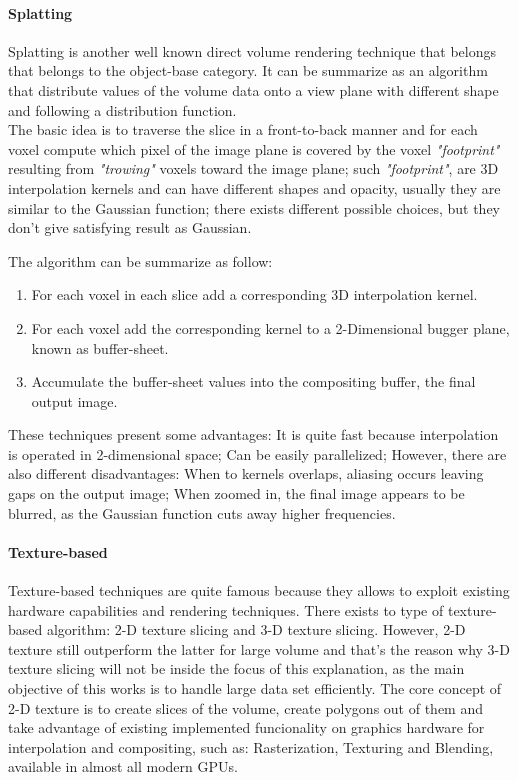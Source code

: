 \documentclass[10pt,a4paper]{article}
\begin{document}
\paragraph{Splatting} Splatting is another well known direct volume rendering technique that belongs that belongs to the object-base category. It can be summarize as an algorithm that distribute values of the volume data onto a view plane with different shape and following a distribution function.\\ The basic idea is to traverse the slice in a front-to-back manner and for each voxel compute which pixel of the image plane is covered by the voxel \textit{"footprint"} resulting from \textit{"trowing"} voxels toward the image plane; such \textit{"footprint"}, are 3D interpolation kernels %
and can have different shapes and opacity, usually they are similar to the Gaussian function; there exists different possible choices, but they don't give satisfying result as Gaussian.

The algorithm can be summarize as follow:
\begin{enumerate}
\item For each voxel in each slice add a corresponding 3D interpolation kernel.
\item For each voxel add the corresponding kernel to a 2-Dimensional bugger plane, known as buffer-sheet.
\item Accumulate the buffer-sheet values into the compositing buffer, the final output image. 
\end{enumerate}

These techniques present some advantages: It is quite fast because interpolation is operated in 2-dimensional space; Can be easily parallelized;
However, there are also different disadvantages: When to kernels overlaps, aliasing occurs leaving gaps on the output image; When zoomed in, the final image appears to be blurred, as the Gaussian function cuts away higher frequencies.

\paragraph{Texture-based} Texture-based techniques are quite famous because they allows to exploit existing hardware capabilities and rendering techniques. There exists to type of texture-based algorithm: 2-D texture slicing and 3-D texture slicing. However, 2-D texture still outperform the latter for large volume and that's the reason why 3-D texture slicing will not be inside the focus of this explanation, as the main objective of this works is to handle large data set efficiently.
The core concept of 2-D texture is to create slices of the volume, create polygons out of them and take advantage of existing implemented funcionality on graphics hardware for interpolation and compositing, such as: Rasterization, Texturing and Blending, available in almost all modern GPUs.
\end{document}
